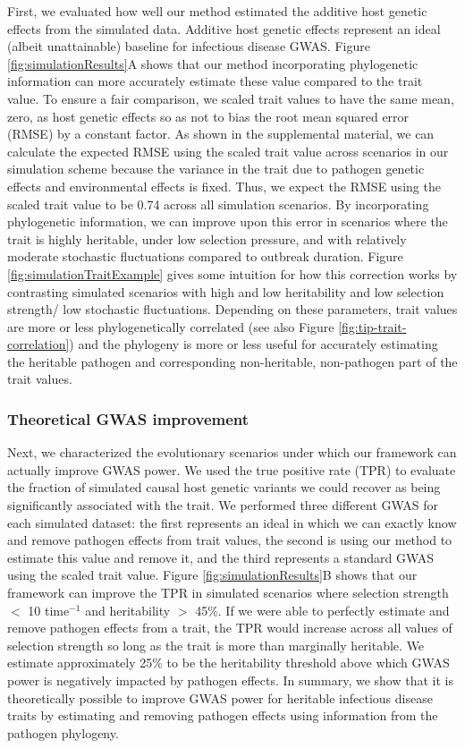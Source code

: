 \documentclass[11pt]{article}
\begin{document}
\begin{linenumbers}
First, we evaluated how well our method estimated the additive host genetic effects from the simulated data. Additive host genetic effects represent an ideal (albeit unattainable) baseline for infectious disease GWAS. Figure \ref{fig:simulationResults}A shows that our method incorporating phylogenetic information can more accurately estimate these value compared to the trait value. To ensure a fair comparison, we scaled trait values to have the same mean, zero, as host genetic effects so as not to bias the root mean squared error (RMSE) by a constant factor. As shown in the supplemental material, we can calculate the expected RMSE using the scaled trait value across scenarios in our simulation scheme because the variance in the trait due to pathogen genetic effects and environmental effects is fixed. Thus, we expect the RMSE using the scaled trait value to be 0.74 across all simulation scenarios. By incorporating phylogenetic information, we can improve upon this error in scenarios where the trait is highly heritable, under low selection pressure, and with relatively moderate stochastic fluctuations compared to outbreak duration. Figure \ref{fig:simulationTraitExample} gives some intuition for how this correction works by contrasting simulated scenarios with high and low heritability and low selection strength/ low stochastic fluctuations. Depending on these parameters, trait values are more or less phylogenetically correlated (see also Figure \ref{fig:tip-trait-correlation}) and the phylogeny is more or less useful for accurately estimating the heritable pathogen and corresponding non-heritable, non-pathogen part of the trait values. 

\subsubsection*{Theoretical GWAS improvement}

Next, we characterized the evolutionary scenarios under which our framework can actually improve GWAS power. We used the true positive rate (TPR) to evaluate the fraction of simulated causal host genetic variants we could recover as being significantly associated with the trait. We performed three different GWAS for each simulated dataset: the first represents an ideal in which we can exactly know and remove pathogen effects from trait values, the second is using our method to estimate this value and remove it, and the third represents a standard GWAS using the scaled trait value. Figure \ref{fig:simulationResults}B shows that our framework can improve the TPR in simulated scenarios where selection strength $<$ 10 time$^{-1}$ and heritability $>$ 45\%. If we were able to perfectly estimate and remove pathogen effects from a trait, the TPR would increase across all values of selection strength so long as the trait is more than marginally heritable. We estimate approximately 25\% to be the heritability threshold above which GWAS power is negatively impacted by pathogen effects. In summary, we show that it is theoretically possible to improve GWAS power for heritable infectious disease traits by estimating and removing pathogen effects using information from the pathogen phylogeny.


\end{linenumbers}
\end{document}
